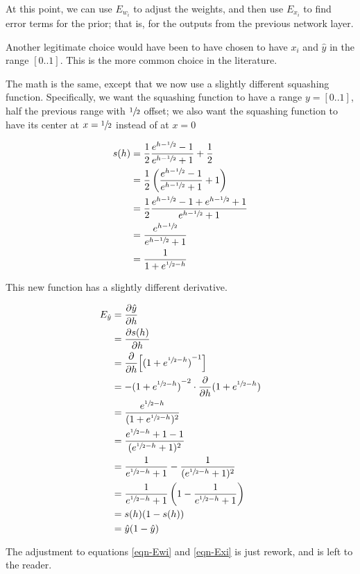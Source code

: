 \documentclass[12pt]{article}
\newcommand{\yhat}{{\hat y}}
\renewcommand{\d}{\partial}
\renewcommand{\dh}{{\partial h}}
\newcommand{\Half}{{\frac 1 2}}
\newcommand{\half}{{\sfrac 1 2}}
\newcommand{\ehh}{{e^{\half - h}}}
\begin{document}
At this point, we can use $E_{w_i}$ to adjust the weights,
and then use $E_{x_i}$ to find error terms for the prior;
that is, for the outputs from the previous network layer.

Another legitimate choice would have been to have chosen to
have $x_i$ and $\yhat$ in the range $[0..1]$. This is the
more common choice in the literature.

The math is the same, except that we now use a slightly
different squashing function. Specifically, we want the
squashing function to have a range $y = [0..1]$, half the
previous range with $\half$ offset; we also want the
squashing function to have its center at $x = \half$ instead
of at $x = 0$

\begin{align}
s(h) &= \Half \frac {e^{h - \half} - 1}  {e^{h - \half} + 1} + \Half \\
     &= \Half \left ( \frac {e^{h - \half} - 1} {e^{h - \half} + 1} + 1 \right ) \\
     &= \Half \frac {e^{h - \half} - 1 + e^{h - \half} + 1} {e^{h - \half} + 1} \\
     &= \frac {e^{h - \half}} {e^{h - \half} + 1} \\
     &= \frac 1 {1 + \ehh}
\end{align}

This new function has a slightly different derivative.

\begin{align}
E_\yhat &= \frac{\d \yhat}{\dh} \\
    &= \frac{\d s(h)}{\dh} \\
    &= \frac \d \dh {\left [{(1 + \ehh)}^{-1} \right ]} \\
    &= -{(1 + \ehh)}^{-2} \cdot \frac \d \dh {(1 + \ehh)} \\
    &= \frac{\ehh}{(1 + \ehh)^2} \\
    &= \frac{\ehh + 1 - 1}{(\ehh + 1)^2} \\
    &= \frac 1 {\ehh + 1} - \frac 1 {(\ehh + 1)^2} \\
    &= \frac 1 {\ehh + 1} \left ( 1 - \frac 1 {\ehh + 1} \right ) \\
    &= s(h) (1 - s(h)) \\
    &= \yhat (1 - \yhat)
\end{align}

The adjustment to equations \ref{eqn-Ewi} and \ref{eqn-Exi}
is just rework, and is left to the reader.
\end{document}
